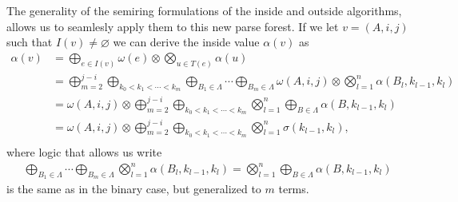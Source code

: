     The generality of the semiring formulations of the inside and outside algorithms, allows us to seamlesly apply them to this new parse forest. If we let $v = (A, i, j)$ such that $I(v) \neq \varnothing$ we can derive the inside value $\alpha(v)$ as
    \begin{align*}
      \alpha(v)
        &= \displaystyle\bigoplus_{e \in I(v)} \omega(e) \otimes \displaystyle\bigotimes_{u \in T(e)} \alpha(u)  \\
        &= \displaystyle\bigoplus_{m = 2}^{j - i} \displaystyle\bigoplus_{k_0 < k_1 < \cdots < k_m} \displaystyle\bigoplus_{B_1 \in \Lambda} \cdots \displaystyle\bigoplus_{B_m \in \Lambda} \omega(A, i, j) \otimes \displaystyle\bigotimes_{l=1}^n \alpha(B_l, k_{l-1}, k_l) \\
        &= \omega(A, i, j) \otimes \displaystyle\bigoplus_{m = 2}^{j - i} \displaystyle\bigoplus_{k_0 < k_1 < \cdots < k_m} \displaystyle\bigotimes_{l=1}^n \displaystyle\bigoplus_{B \in \Lambda} \alpha(B, k_{l-1}, k_l) \\
        &= \omega(A, i, j) \otimes \displaystyle\bigoplus_{m = 2}^{j - i} \displaystyle\bigoplus_{k_0 < k_1 < \cdots < k_m} \displaystyle\bigotimes_{l=1}^n \sigma(k_{l-1}, k_l), \\
    \end{align*}
    where logic that allows us write
    \begin{align*}
      \displaystyle\bigoplus_{B_1 \in \Lambda} \cdots \displaystyle\bigoplus_{B_m \in \Lambda} \displaystyle\bigotimes_{l=1}^n \alpha(B_l, k_{l-1}, k_l) = \displaystyle\bigotimes_{l=1}^n \displaystyle\bigoplus_{B \in \Lambda} \alpha(B, k_{l-1}, k_l)
    \end{align*}
    is the same as in the binary case, but generalized to $m$ terms.

